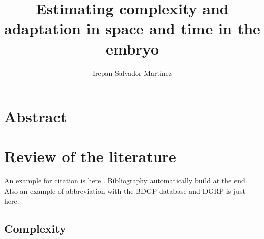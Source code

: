 \documentclass[officiallayout]{tktla_modified}
\title{Estimating complexity and adaptation in space and time in the embryo
}
\author{Irepan Salvador-Mart\'inez}
\begin{document}
\frontmatter

\maketitle
\makenomenclature

\begin{acknowledgements}
  
\end{acknowledgements}


\tableofcontents

\mainmatter





\printnomenclature


\chapter{Abstract}
	


\chapter{Review of the literature}
	
An example for citation is here 
\citep{Tomancak2002}.
Bibliography automatically build at the end. Also an example of abbreviation with the BDGP database
and DGRP
is just here.
	

	\section{Complexity}
	
	\clearpage 
\end{document}
